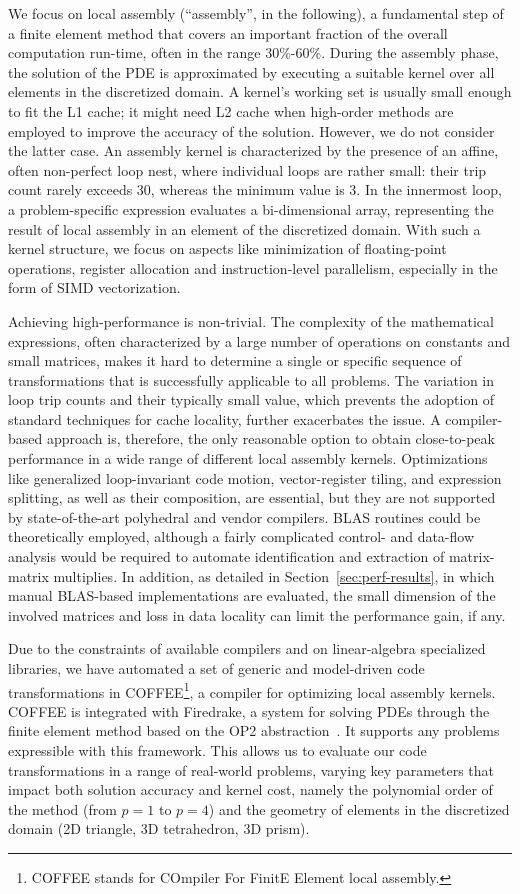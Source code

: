 \documentclass[conference]{IEEEtran}
\begin{document}
We focus on local assembly (``assembly'', in the following), a fundamental step of a finite element method that covers an important fraction of the overall computation run-time, often in the range 30$\%$-60$\%$. During the assembly phase, the solution of the PDE is approximated by executing a suitable kernel over all elements in the discretized domain. A kernel's working set is usually small enough to fit the L1 cache; it might need L2 cache when high-order methods are employed to improve the accuracy of the solution. However, we do not consider the latter case. An assembly kernel is characterized by the presence of an affine, often non-perfect loop nest, where individual loops are rather small: their trip count rarely exceeds 30, whereas the minimum value is 3. In the innermost loop, a problem-specific expression evaluates a bi-dimensional array, representing the result of local assembly in an element of the discretized domain. With such a kernel structure, we focus on aspects like minimization of floating-point operations, register allocation and instruction-level parallelism, especially in the form of SIMD vectorization.

Achieving high-performance is non-trivial. The complexity of the mathematical expressions, often characterized by a large number of operations on constants and small matrices, makes it hard to determine a single or specific sequence of transformations that is successfully applicable to all problems. The variation in loop trip counts and their typically small value, which prevents the adoption of standard techniques for cache locality, further exacerbates the issue. A compiler-based approach is, therefore, the only reasonable option to obtain close-to-peak performance in a wide range of different local assembly kernels. Optimizations like generalized loop-invariant code motion, vector-register tiling, and expression splitting, as well as their composition, are essential, but they are not supported by state-of-the-art polyhedral and vendor compilers. BLAS routines could be theoretically employed, although a fairly complicated control- and data-flow analysis would be required to automate identification and extraction of matrix-matrix multiplies. In addition, as detailed in Section~\ref{sec:perf-results}, in which manual BLAS-based implementations are evaluated, the small dimension of the involved matrices and loss in data locality can limit the performance gain, if any.

Due to the constraints of available compilers and on linear-algebra specialized libraries, we have automated a set of generic and model-driven code transformations in COFFEE\footnote{COFFEE stands for COmpiler For FinitE Element local assembly.}, a compiler for optimizing local assembly kernels. COFFEE is integrated with Firedrake, a system for solving PDEs through the finite element method based on the OP2 abstraction~\cite{firedrake-code}. It supports any problems expressible with this framework. This allows us to evaluate our code transformations in a range of real-world problems, varying key parameters that impact both solution accuracy and kernel cost, namely the polynomial order of the method (from $p=1$ to $p=4$) and the geometry of elements in the discretized domain (2D triangle, 3D tetrahedron, 3D prism).
\end{document}
